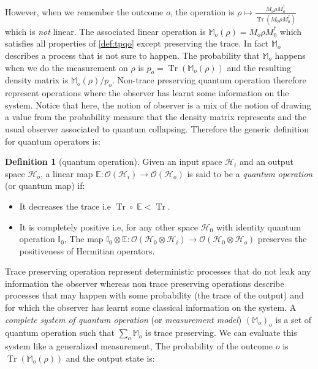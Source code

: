 \documentclass[10pt,a4paper]{report}
\theoremstyle{plain}
\theoremstyle{definition}
\newtheorem{defn}{Definition}[chapter]
\theoremstyle{remark}
\DeclareMathOperator{\Tr}{Tr}
\begin{document}
However, when we remember the outcome $o$, the operation is $\rho \mapsto
\frac{M_o \rho M_o^\dagger}{\Tr(M_0\rho M_0^\dagger)}$ which is \emph{not}
linear. The associated linear operation is $\mathbb{M}_o(\rho) = M_o\rho
M_0^\dagger$ which satisfies all properties of \cref{def:tpqo} except preserving
the trace. In fact $\mathbb{M}_o$ describes a process that is not sure to
happen. The probability that $\mathbb{M}_o$ happens when we do the measurement
on $\rho$ is $p_o = \Tr(\mathbb{M}_o(\rho))$ and the resulting density matrix is
$\mathbb{M}_o(\rho)/p_o$.
Non-trace preserving quantum operation therefore represent
operations where the observer has learnt some information on the system. Notice
that here, the notion of observer is a mix of the notion of drawing a value from
the probability measure that the density matrix represents and the usual observer
associated to quantum collapsing. Therefore the generic definition for quantum
operators is:
\begin{defn}[quantum operation]\label{def:qo}
  Given an input space $\mathcal{H}_i$ and an output space $\mathcal{H}_o$, a
  linear map $\mathbb E : \mathcal{O}(\mathcal{H}_i) \to
  \mathcal{O}(\mathcal{H}_o)$ is said to be a \emph{quantum
    operation} (or quantum map) if:
  \begin{itemize}
  \item It decreases the trace i.e $\Tr \circ\; \mathbb E < \Tr$.
  \item It is completely positive i.e, for any other space $\mathcal{H}_0$ with
    identity quantum operation $\mathbb I_0$, The map $\mathbb I_0 \otimes
    \mathbb E : \mathcal{O}(\mathcal{H}_0 \otimes \mathcal{H}_i) \to
    \mathcal{O}(\mathcal{H}_0 \otimes \mathcal{H}_o)$ preserves the positiveness
    of Hermitian operators.
  \end{itemize}
\end{defn}

Trace preserving operation represent deterministic processes
that do not leak any information the observer whereas non trace preserving operations describe
processes that may happen with some probability (the trace of the output) and for which the
observer has learnt some classical information on the system. A \emph{complete system of
  quantum operation} (or \emph{measurement model}) ${(\mathbb{M}_o)}_o$ is a set of quantum
operation such that $\sum_o \mathbb M_o$ is trace preserving. We can evaluate
this system like a generalized measurement, The probability of the outcome $o$
is $\Tr(\mathbb M_o(\rho))$ and the output state is:
\end{document}
